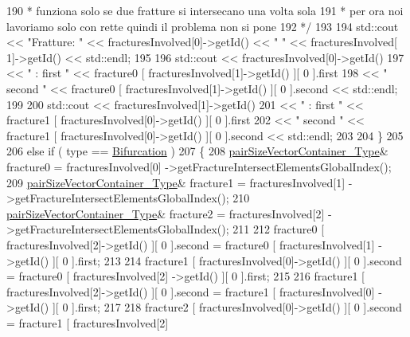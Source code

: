 \begin{DoxyCode}
190 \textcolor{comment}{                 * funziona solo se due fratture si intersecano una volta sola}
191 \textcolor{comment}{                 * per ora noi lavoriamo solo con rette quindi il problema non si pone}
192 \textcolor{comment}{                 */}
193     
194                 std::cout << \textcolor{stringliteral}{"Fratture: "} << fracturesInvolved[0]->getId() << \textcolor{stringliteral}{"     "} << fracturesInvolved[
      1]->getId() << std::endl;
195     
196                 std::cout << fracturesInvolved[0]->getId()
197                                 << \textcolor{stringliteral}{" :   first "} << fracture0 [ fracturesInvolved[1]->getId() ][ 0 ].first
198                                 << \textcolor{stringliteral}{" second "} << fracture0 [ fracturesInvolved[1]->getId() ][ 0 ].second <<
       std::endl;
199     
200                 std::cout << fracturesInvolved[1]->getId()
201                                 << \textcolor{stringliteral}{" :   first "} << fracture1 [ fracturesInvolved[0]->getId() ][ 0 ].first
202                                 << \textcolor{stringliteral}{" second "} << fracture1 [ fracturesInvolved[0]->getId() ][ 0 ].second <<
       std::endl;
203     
204             \}
205 
206             \textcolor{keywordflow}{else} \textcolor{keywordflow}{if} ( type == \hyperlink{classFractureIntersect_a9a4e4a784fa4c8e359767ed543f89dc5a4d466b3d3de0af7e18732b6f765bb1af}{Bifurcation} )
207             \{    
208                 \hyperlink{Core_8h_a9bc476e433f99b82a9c2b8560735c7b5}{pairSizeVectorContainer\_Type}& fracture0 = fracturesInvolved[0]
      ->getFractureIntersectElementsGlobalIndex();
209                 \hyperlink{Core_8h_a9bc476e433f99b82a9c2b8560735c7b5}{pairSizeVectorContainer\_Type}& fracture1 = fracturesInvolved[1]
      ->getFractureIntersectElementsGlobalIndex();
210                 \hyperlink{Core_8h_a9bc476e433f99b82a9c2b8560735c7b5}{pairSizeVectorContainer\_Type}& fracture2 = fracturesInvolved[2]
      ->getFractureIntersectElementsGlobalIndex();
211                 
212                 fracture0 [ fracturesInvolved[2]->getId() ][ 0 ].second = fracture0 [ fracturesInvolved[1]
      ->getId() ][ 0 ].first;
213      
214                 fracture1 [ fracturesInvolved[0]->getId() ][ 0 ].second = fracture0 [ fracturesInvolved[2]
      ->getId() ][ 0 ].first;
215      
216                 fracture1 [ fracturesInvolved[2]->getId() ][ 0 ].second = fracture1 [ fracturesInvolved[0]
      ->getId() ][ 0 ].first;
217      
218                 fracture2 [ fracturesInvolved[0]->getId() ][ 0 ].second = fracture1 [ fracturesInvolved[2]

\end{DoxyCode}
